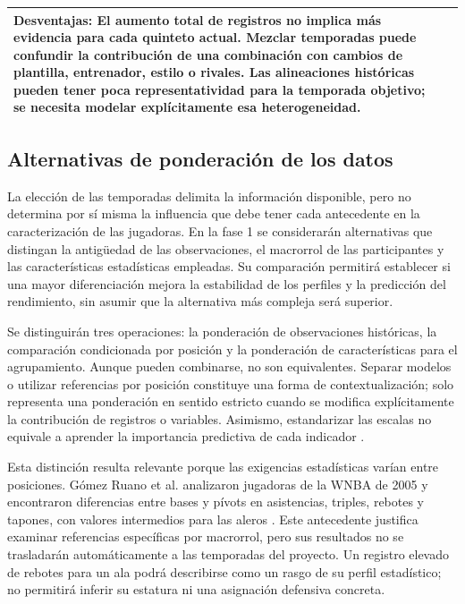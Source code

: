 \begin{longtable}{@{}p{2.15cm}p{5.35cm}p{5.35cm}@{}}
\textbf{Desventajas:} El aumento total de registros no implica más evidencia para cada quinteto actual. Mezclar temporadas puede confundir la contribución de una combinación con cambios de plantilla, entrenador, estilo o rivales. Las alineaciones históricas pueden tener poca representatividad para la temporada objetivo; se necesita modelar explícitamente esa heterogeneidad.\\
\bottomrule
\end{longtable}

\subsection{Alternativas de ponderación de los datos}
\label{subsec:alternativas-ponderacion}
La elección de las temporadas delimita la información disponible, pero no determina por sí misma la influencia que debe tener cada antecedente en la caracterización de las jugadoras. En la fase 1 se considerarán alternativas que distingan la antigüedad de las observaciones, el macrorrol de las participantes y las características estadísticas empleadas. Su comparación permitirá establecer si una mayor diferenciación mejora la estabilidad de los perfiles y la predicción del rendimiento, sin asumir que la alternativa más compleja será superior.

Se distinguirán tres operaciones: la ponderación de observaciones históricas, la comparación condicionada por posición y la ponderación de características para el agrupamiento. Aunque pueden combinarse, no son equivalentes. Separar modelos o utilizar referencias por posición constituye una forma de contextualización; solo representa una ponderación en sentido estricto cuando se modifica explícitamente la contribución de registros o variables. Asimismo, estandarizar las escalas no equivale a aprender la importancia predictiva de cada indicador \cite{bishop2006pattern,huang2005variableweighting}.

Esta distinción resulta relevante porque las exigencias estadísticas varían entre posiciones. Gómez Ruano et al. analizaron jugadoras de la WNBA de 2005 y encontraron diferencias entre bases y pívots en asistencias, triples, rebotes y tapones, con valores intermedios para las aleros \cite{gomez2007posicioneswnba}. Este antecedente justifica examinar referencias específicas por macrorrol, pero sus resultados no se trasladarán automáticamente a las temporadas del proyecto. Un registro elevado de rebotes para un ala podrá describirse como un rasgo de su perfil estadístico; no permitirá inferir su estatura ni una asignación defensiva concreta.

